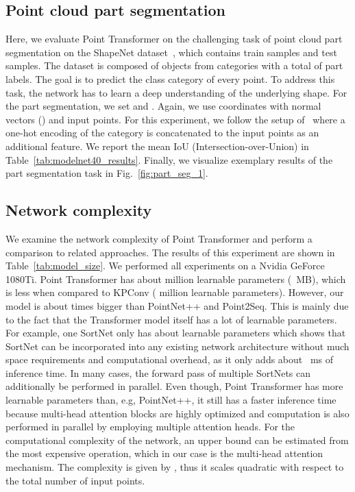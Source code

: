 \documentclass{ieeeaccess}
\begin{document}
\subsection{Point cloud part segmentation}
Here, we evaluate Point Transformer on the challenging task of point cloud part segmentation on the ShapeNet dataset~\cite{shapenet2015}, which contains  train samples and  test samples. The dataset is composed of objects from  categories with a total of  part labels. The goal is to predict the class category of every point. To address this task, the network has to learn a deep understanding of the underlying shape. For the part segmentation, we set  and . Again, we use  coordinates with normal vectors () and  input points. For this experiment, we follow the setup of~\cite{qi2017pointnet} where a one-hot encoding of the  category is concatenated to the input points as an additional feature. We report the mean IoU (Intersection-over-Union) in Table~\ref{tab:modelnet40_results}. Finally, we visualize exemplary results of the part segmentation task in Fig.~\ref{fig:part_seg_1}.


\subsection{Network complexity}
We examine the network complexity of Point Transformer and perform a comparison to related approaches. The results of this experiment are shown in Table~\ref{tab:model_size}. We performed all experiments on a Nvidia GeForce 1080Ti. Point Transformer has about  million learnable parameters (~MB), which is less when compared to KPConv ( million learnable parameters). However, our model is about  times bigger than PointNet++ and Point2Seq. This is mainly due to the fact that the Transformer model itself has a lot of learnable parameters. For example, one SortNet only has about  learnable parameters which shows that SortNet can be incorporated into any existing network architecture without much space requirements and computational overhead, as it only adds about ~ms of inference time. In many cases, the forward pass of multiple SortNets can additionally be performed in parallel. Even though, Point Transformer has more learnable parameters than, e.g, PointNet++, it still has a faster inference time because multi-head attention blocks are highly optimized and computation is also performed in parallel by employing multiple attention heads. For the computational complexity of the network, an upper bound can be estimated from the most expensive operation, which in our case is the multi-head attention mechanism. The complexity is given by , thus it scales quadratic with respect to the total number of input points.
\end{document}
